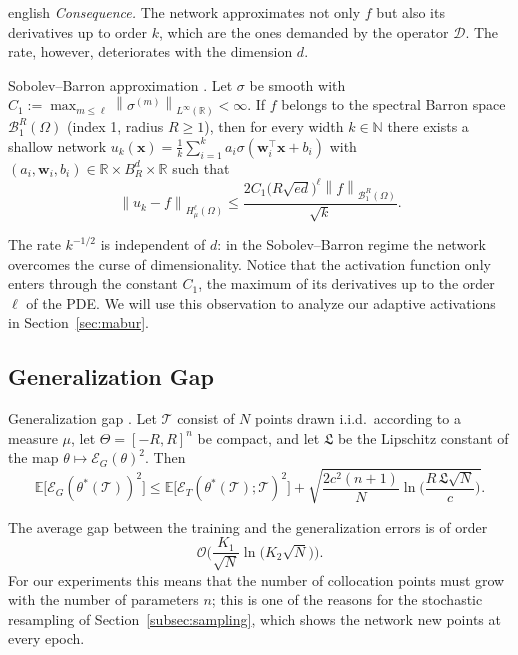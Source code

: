 \documentclass[12pt,letterpaper,twoside]{book}
\newcommand{\norm}[1]{\left\lVert #1 \right\rVert}
\newcommand{\T}{\mathcal{T}}
\begin{document}
\begin{hyphenrules}{english}
\emph{Consequence.} The network approximates not only $f$ but also its derivatives up to order $k$, which
are the ones demanded by the operator $\mathcal{D}$. The rate, however, deteriorates with the dimension
$d$.

\begin{teorema}{Sobolev--Barron approximation \cite[Theorem~4.33]{deryck2024acta}.}\label{thm:barron}
Let $\sigma$ be smooth with $C_1:=\max_{m\le\ell}\norm{\sigma^{(m)}}_{L^\infty(\mathbb{R})}<\infty$. If $f$
belongs to the spectral Barron space $\mathcal{B}^{R}_{1}(\Omega)$ (index 1, radius $R\ge1$), then for
every width $k\in\mathbb{N}$ there exists a shallow network
$u_k(\mathbf{x})=\frac1k\sum_{i=1}^{k}a_i\sigma(\mathbf{w}_i^{\top}\mathbf{x}+b_i)$ with
$(a_i,\mathbf{w}_i,b_i)\in\mathbb{R}\times B^d_R\times\mathbb{R}$ such that
\[
  \norm{u_k-f}_{H^{\ell}_{\mu}(\Omega)}\le\frac{2C_1\big(R\sqrt{ed}\big)^{\ell}\norm{f}_{\mathcal{B}^R_1(\Omega)}}{\sqrt{k}}.
\]
\end{teorema}

The rate $k^{-1/2}$ is independent of $d$: in the Sobolev--Barron regime the network overcomes the
curse of dimensionality. Notice that the activation function only enters through the constant $C_1$,
the maximum of its derivatives up to the order $\ell$ of the PDE. We will use this observation to
analyze our adaptive activations in Section~\ref{sec:mabur}.

\subsection{Generalization Gap}

\begin{teorema}{Generalization gap \cite[Theorem~6.2]{deryck2022kolmogorov,beck2022}.}\label{thm:generalization}
Let $\T$ consist of $N$ points drawn i.i.d.\ according to a measure $\mu$, let $\Theta=[-R,R]^{n}$ be
compact, and let $\mathfrak{L}$ be the Lipschitz constant of the map $\theta\mapsto\mathcal{E}_G(\theta)^2$.
Then
\[
  \mathbb{E}\big[\mathcal{E}_G(\theta^{*}(\T))^2\big]\le\mathbb{E}\big[\mathcal{E}_T(\theta^{*}(\T);\T)^2\big]
  +\sqrt{\frac{2c^2(n+1)}{N}\ln\Big(\frac{R\,\mathfrak{L}\sqrt{N}}{c}\Big)}.
\]
\end{teorema}

The average gap between the training and the generalization errors is of order
\[
  \mathcal{O}\Big(\frac{K_1}{\sqrt N}\ln\big(K_2\sqrt N\big)\Big).
\] For our experiments this means that the number
of collocation points must grow with the number of parameters $n$; this is one of the reasons for the
stochastic resampling of Section~\ref{subsec:sampling}, which shows the network new points at every epoch.


\end{hyphenrules}
\end{document}
